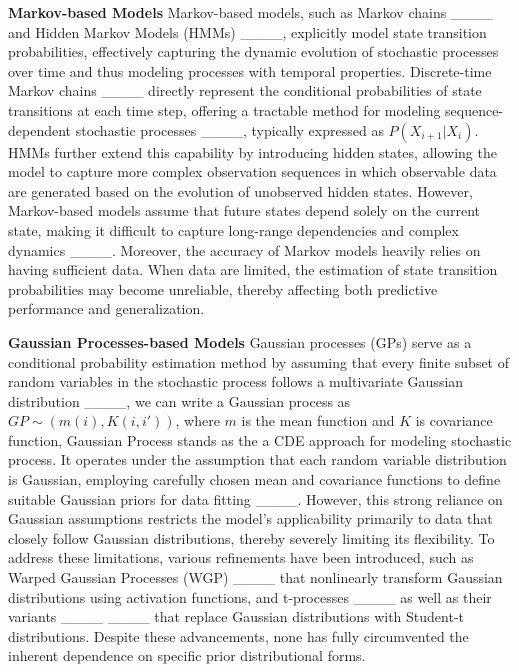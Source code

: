 \noindent \textbf{Markov-based Models}   Markov-based models, such as Markov chains 
 ____ and Hidden Markov Models (HMMs) ____, explicitly model state transition probabilities, effectively capturing the dynamic evolution of stochastic processes over time and thus modeling processes with temporal properties. Discrete-time Markov chains ____ directly represent the conditional probabilities of state transitions at each time step, offering a tractable method for modeling sequence-dependent stochastic processes ____, typically expressed as $P(X_{i+1}|X_i)$. HMMs further extend this capability by introducing hidden states, allowing the model to capture more complex observation sequences in which observable data are generated based on the evolution of unobserved hidden states.
However, Markov-based models assume that future states depend solely on the current state, making it difficult to capture long-range dependencies and complex dynamics 
____. Moreover, the accuracy of Markov models heavily relies on having sufficient data. When data are limited, the estimation of state transition probabilities may become unreliable, thereby affecting both predictive performance and generalization.

\noindent \textbf{Gaussian Processes-based Models}   Gaussian processes (GPs) serve as a conditional probability estimation method by assuming that every finite subset of random variables in the stochastic process follows a multivariate Gaussian distribution 
 ____, we can write a Gaussian process as $GP \sim (m(i),K(i,i'))$, where $m$ is the mean function and $K$ is covariance function, 
Gaussian Process stands as the a CDE approach for modeling stochastic process. It operates under the assumption that each random variable distribution is Gaussian, employing carefully chosen mean and covariance functions to define suitable Gaussian priors for data fitting ____. However, this strong reliance on Gaussian assumptions restricts the model’s applicability primarily to data that closely follow Gaussian distributions, thereby severely limiting its flexibility. To address these limitations, various refinements have been introduced, such as Warped Gaussian Processes (WGP) 
____ that nonlinearly transform Gaussian distributions using activation functions, and t-processes ____ as well as their variants ____ ____ that replace Gaussian distributions with Student-t distributions. Despite these advancements, none has fully circumvented the inherent dependence on specific prior distributional forms.

